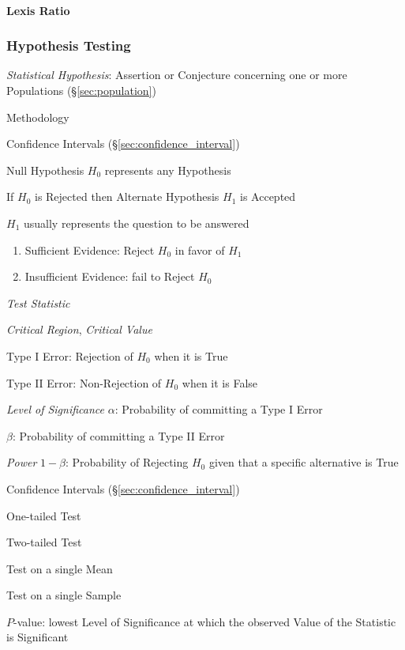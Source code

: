 \paragraph{Lexis Ratio}\label{sec:lexis_ratio}\hfill



\subsubsection{Hypothesis Testing}\label{sec:hypothesis_testing}

\emph{Statistical Hypothesis}: Assertion or Conjecture concerning one
or more Populations (\S\ref{sec:population})

Methodology

Confidence Intervals (\S\ref{sec:confidence_interval})

Null Hypothesis $H_0$ represents any Hypothesis

If $H_0$ is Rejected then Alternate Hypothesis $H_1$ is Accepted

$H_1$ usually represents the question to be answered

\begin{enumerate}
  \item Sufficient Evidence: Reject $H_0$ in favor of $H_1$
  \item Insufficient Evidence: fail to Reject $H_0$
\end{enumerate}

\emph{Test Statistic}

\emph{Critical Region}, \emph{Critical Value}

Type I Error: Rejection of $H_0$ when it is True

Type II Error: Non-Rejection of $H_0$ when it is False

\emph{Level of Significance} $\alpha$: Probability of committing a
Type I Error

$\beta$: Probability of committing a Type II Error

\emph{Power} $1 - \beta$: Probability of Rejecting $H_0$ given that a
specific alternative is True

Confidence Intervals (\S\ref{sec:confidence_interval})

One-tailed Test

Two-tailed Test

Test on a single Mean

Test on a single Sample

$P$-value: lowest Level of Significance at which the observed Value of
the Statistic is Significant



